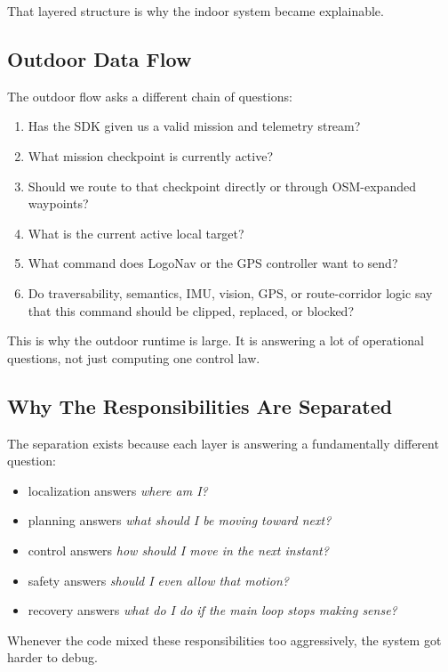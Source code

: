 \documentclass[11pt]{article}
\begin{document}
That layered structure is why the indoor system became explainable.

\subsection{Outdoor Data Flow}

The outdoor flow asks a different chain of questions:

\begin{enumerate}[nosep]
  \item Has the SDK given us a valid mission and telemetry stream?
  \item What mission checkpoint is currently active?
  \item Should we route to that checkpoint directly or through OSM-expanded
  waypoints?
  \item What is the current active local target?
  \item What command does LogoNav or the GPS controller want to send?
  \item Do traversability, semantics, IMU, vision, GPS, or route-corridor logic
  say that this command should be clipped, replaced, or blocked?
\end{enumerate}

This is why the outdoor runtime is large. It is answering a lot of operational
questions, not just computing one control law.

\subsection{Why The Responsibilities Are Separated}

The separation exists because each layer is answering a fundamentally different
question:

\begin{itemize}[nosep]
  \item localization answers \emph{where am I?}
  \item planning answers \emph{what should I be moving toward next?}
  \item control answers \emph{how should I move in the next instant?}
  \item safety answers \emph{should I even allow that motion?}
  \item recovery answers \emph{what do I do if the main loop stops making sense?}
\end{itemize}

Whenever the code mixed these responsibilities too aggressively, the system got
harder to debug.
\end{document}
